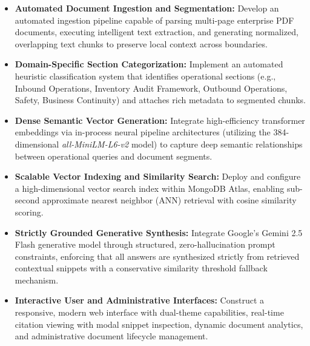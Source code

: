 \begin{itemize}
    \item \textbf{Automated Document Ingestion and Segmentation:} Develop an automated ingestion pipeline capable of parsing multi-page enterprise PDF documents, executing intelligent text extraction, and generating normalized, overlapping text chunks to preserve local context across boundaries.
    \item \textbf{Domain-Specific Section Categorization:} Implement an automated heuristic classification system that identifies operational sections (e.g., Inbound Operations, Inventory Audit Framework, Outbound Operations, Safety, Business Continuity) and attaches rich metadata to segmented chunks.
    \item \textbf{Dense Semantic Vector Generation:} Integrate high-efficiency transformer embeddings via in-process neural pipeline architectures (utilizing the 384-dimensional \emph{all-MiniLM-L6-v2} model) to capture deep semantic relationships between operational queries and document segments.
    \item \textbf{Scalable Vector Indexing and Similarity Search:} Deploy and configure a high-dimensional vector search index within MongoDB Atlas, enabling sub-second approximate nearest neighbor (ANN) retrieval with cosine similarity scoring.
    \item \textbf{Strictly Grounded Generative Synthesis:} Integrate Google's Gemini 2.5 Flash generative model through structured, zero-hallucination prompt constraints, enforcing that all answers are synthesized strictly from retrieved contextual snippets with a conservative similarity threshold fallback mechanism.
    \item \textbf{Interactive User and Administrative Interfaces:} Construct a responsive, modern web interface with dual-theme capabilities, real-time citation viewing with modal snippet inspection, dynamic document analytics, and administrative document lifecycle management.
\end{itemize}
